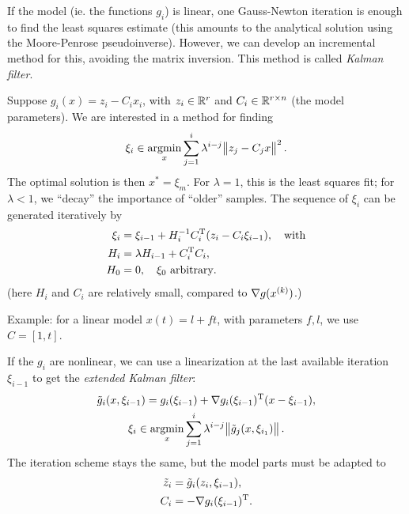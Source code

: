\documentclass{article}
\begin{document}
\label{s:kalman-filter}

If the model (ie. the functions \(g_i\)) is linear, one Gauss-Newton iteration is enough to find the
least squares estimate (this amounts to the analytical solution using the Moore-Penrose
pseudoinverse).  However, we can develop an incremental method for this, avoiding the matrix
inversion.  This method is called \emph{Kalman filter}.

Suppose \(g_i(x) = z_i - C_i x_i\), with \(z_i \in \mathbb{R}^r\) and \(C_i \in \mathbb{R}^{r \times n}\) (the
model parameters).  We are interested in a method for finding
\begin{equation*}
  \xi_i \in \argmin_x \sum_{j=1}^{i} \lambda^{i-j} \enVert[1]{z_j - C_j x}^2.
\end{equation*}
The optimal solution is then \(x^* = \xi_m\).  For \(\lambda = 1\), this is the least squares fit;
for \(\lambda < 1\), we ``decay'' the importance of ``older'' samples.  The sequence of \(\xi_i\)
can be generated iteratively by
\begin{align*}
  \xi_i &= \xi_{i-1} + H_i^{-1}C_i^{\mathrm{T}}(z_i - C_i \xi_{i-1}), \quad\text{with} \\
  H_i &= \lambda H_{i-1} + C_i^{\mathrm{T}}C_i, \\
  H_0 &= 0,\quad \xi_0 \text{ arbitrary}.
\end{align*}
(here \(H_i\) and \(C_i\) are relatively small, compared to \(\nabla g(x^{(k)})\).)

Example: for a linear model \(x(t) = l + ft\), with parameters \(f, l\), we use \(C = [1, t]\).


\label{s:extended-kalman-filter}

If the \(g_i\) are nonlinear, we can use a linearization at the last available iteration
\(\xi_{i-1}\) to get the \emph{extended Kalman filter}:
\begin{gather*}
  \tilde{g}_i(x, \xi_{i-1}) = g_i(\xi_{i-1}) + \T{\nabla g_i(\xi_{i-1})}(x - \xi_{i-1}), \\
  \xi_i \in \argmin_x \sum_{j=1}^{i} \lambda^{i-j} \enVert[1]{\tilde{g}_j(x, \xi_{i_1})}.
\end{gather*}
The iteration scheme stays the same, but the model parts must be adapted to
\begin{align*}
  \tilde{z}_i &= \tilde{g}_i(z_i, \xi_{i-1}), \\
  C_i &= - \nabla g_i(\xi_{i-1})^{\mathrm{T}}.
\end{align*}


\end{document}
